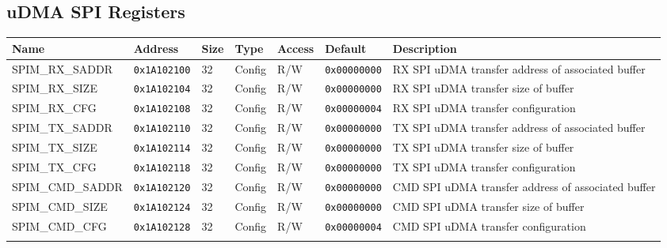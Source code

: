 
\subsection{uDMA SPI Registers}
{\small
\begin{tabularx}{\textwidth}{|l|l|l|l|l|l|X|}
  \hline
  \textbf{Name} & \textbf{Address}  & \textbf{Size} & \textbf{Type} & \textbf{Access} & \textbf{Default} & \textbf{Description} \\
  \hline
  SPIM\_RX\_SADDR & \texttt{0x1A102100} & 32 & Config & R/W & \texttt{0x00000000} & RX SPI uDMA transfer address of associated buffer\\
  \hline
  SPIM\_RX\_SIZE & \texttt{0x1A102104} & 32 & Config & R/W & \texttt{0x00000000} & RX SPI uDMA transfer size of buffer\\
  \hline
  SPIM\_RX\_CFG & \texttt{0x1A102108} & 32 & Config & R/W & \texttt{0x00000004} & RX SPI uDMA transfer configuration\\
  \hline
  SPIM\_TX\_SADDR & \texttt{0x1A102110} & 32 & Config & R/W & \texttt{0x00000000} & TX SPI uDMA transfer address of associated buffer\\
  \hline
  SPIM\_TX\_SIZE & \texttt{0x1A102114} & 32 & Config & R/W & \texttt{0x00000000} & TX SPI uDMA transfer size of buffer\\
  \hline
  SPIM\_TX\_CFG & \texttt{0x1A102118} & 32 & Config & R/W & \texttt{0x00000000} & TX SPI uDMA transfer configuration\\
  \hline
  SPIM\_CMD\_SADDR & \texttt{0x1A102120} & 32 & Config & R/W & \texttt{0x00000000} & CMD SPI uDMA transfer address of associated buffer\\
  \hline
  SPIM\_CMD\_SIZE & \texttt{0x1A102124} & 32 & Config & R/W & \texttt{0x00000000} & CMD SPI uDMA transfer size of buffer\\
  \hline
  SPIM\_CMD\_CFG & \texttt{0x1A102128} & 32 & Config & R/W & \texttt{0x00000004} & CMD SPI uDMA transfer configuration\\
  \hline
  \caption{uDMA SPI}
\end{tabularx}
}




